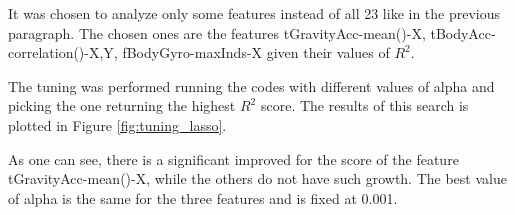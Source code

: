 \documentclass[10pt, a4paper, twocolumn]{article}
\begin{document}
It was chosen to analyze only some features instead of all 23 like in the previous paragraph. The chosen ones are the features tGravityAcc-mean()-X, tBodyAcc-correlation()-X,Y, fBodyGyro-maxInds-X given their values of $R^2$. 

The tuning was performed running the codes with different values of alpha and picking the one returning the highest $R^2$ score.
The results of this search is plotted in Figure \ref{fig:tuning_lasso}.

As one can see, there is a significant improved for the score of the feature tGravityAcc-mean()-X, while the others do not have such growth. The best value of alpha is the same for the three features and is fixed at 0.001.

\begin{table}[t]
    \caption{Coefficients of the Linear Regression with the Lasso/Ridge Penalty: a comparison.}
    \label{tab:lassoridge2}
\end{table}
\end{document}
